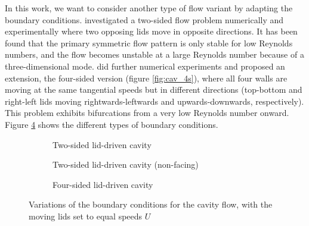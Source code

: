In this work, we want to consider another type of flow variant by adapting the
boundary conditions. \cite{kuhlmann1997} investigated a two-sided flow problem
numerically and experimentally where two opposing lids move in opposite
directions. It has been found that the primary symmetric flow pattern is only
stable for low Reynolds numbers, and the flow becomes unstable at a large
Reynolds number because of a three-dimensional mode. \citep{wahba2009} did
further numerical experiments and proposed an extension, the four-sided version
(figure \ref{fig:cav_4s}), where all four walls are moving at the same
tangential speeds but in different directions (top-bottom and right-left lids
moving rightwards-leftwards and upwards-downwards, respectively). This problem
exhibits bifurcations from a very low Reynolds number onward. Figure
\ref{fig:bc_types} shows the different types of boundary conditions.

\begin{figure}[ht]
\centering
\begin{subfigure}[b]{0.3\textwidth}
  \centering
  \caption{Two-sided lid-driven cavity \\ \hspace{\textwidth}}
  \label{subfig:bc_2s}
\end{subfigure}
\begin{subfigure}[b]{0.3\textwidth}
  \centering
  \caption{Two-sided lid-driven cavity (non-facing)}
  \label{subfig:bc_2s_nf}
\end{subfigure}
\begin{subfigure}[b]{0.3\textwidth}
  \centering
  \caption{Four-sided lid-driven cavity \\ \hspace{\textwidth}}
  \label{subfig:bc_4s}
\end{subfigure}

\caption{Variations of the boundary conditions for the cavity flow,
 with  the moving lids set to equal speeds $U$}
\label{fig:bc_types}
\end{figure}

